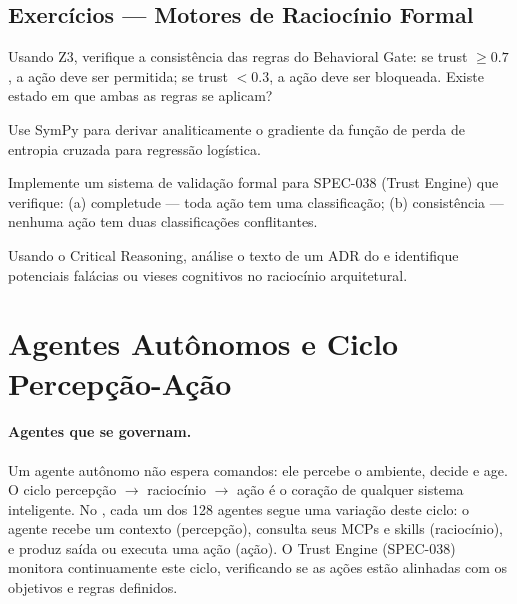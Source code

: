\subsection{Exercícios — Motores de Raciocínio Formal}
\begin{exercicio}
Usando Z3, verifique a consistência das regras do Behavioral Gate:
se trust $\geq 0.7$, a ação deve ser permitida; se trust $< 0.3$, a
ação deve ser bloqueada. Existe estado em que ambas as regras se aplicam?
\end{exercicio}
\begin{exercicio}
Use SymPy para derivar analiticamente o gradiente da função de perda
de entropia cruzada para regressão logística.
\end{exercicio}
\begin{exercicio}
Implemente um sistema de validação formal para SPEC-038 (Trust Engine) que
verifique: (a) completude --- toda ação tem uma classificação; (b)
consistência --- nenhuma ação tem duas classificações conflitantes.
\end{exercicio}
\begin{exercicio}
Usando o Critical Reasoning, análise o texto de um ADR do \opencodeeco{}
e identifique potenciais falácias ou vieses cognitivos no raciocínio
arquitetural.
\end{exercicio}
\section{Agentes Autônomos e Ciclo Percepção-Ação}
\label{sec:agentes-autonomos}
\nivelphd

\paragraph{Agentes que se governam.} Um agente autônomo não espera comandos:
ele percebe o ambiente, decide e age. O ciclo percepção $\to$ raciocínio
$\to$ ação é o coração de qualquer sistema inteligente. No \opencodeeco{},
cada um dos 128 agentes segue uma variação deste ciclo: o agente recebe um
contexto (percepção), consulta seus MCPs e skills (raciocínio), e produz
saída ou executa uma ação (ação). O Trust Engine (SPEC-038) monitora
continuamente este ciclo, verificando se as ações estão alinhadas com os
objetivos e regras definidos.

